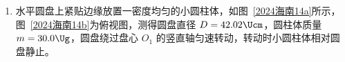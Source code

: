 \documentclass[\gkver]{gaokaozhenti}
\begin{document}
\begin{enumerate}
{联立有

$a_{2} = \frac{F - m_{2}g\sin30^\circ}{m_{2} + CB^{2}L^{2}}$

则说明金属棒 cd 做匀加速直线运动，则有

$x_{0} = \frac{1}{2}a_{2}t^{2}$

联立解得 $a_{2} = 6 \Umsq$，$t = 1.2 \Us$

故 A 错误；

B．由题知，碰前瞬间 ab 的速度为 $4.5 \Ums$，则根据功能关系有

$m_{1}gx_{ab}\sin30^\circ - Q = \frac{1}{2}m_{1}v_{1}^{2}$

金属棒下滑过程中根据动量定理有

$m_{1}g\sin30^\circ\cdot t - B\bar{I}L\cdot t = m_{1}v_{1}$

其中 $q = \bar{I}t = \frac{BLx_{ab}}{R_{\text{总}}}$，$R_{\text{总}} = R + R_{ab} = 0.1 \UO$

联立解得 $q = 6 \UC$，$x_{ab} = 3 \Um$，$Q = 3.9 \UJ$

则 R 上消耗的焦耳热为

$Q_{R} = \frac{R}{R_{\text{总}}}Q = 0.78 \UJ$

故 B 正确；

CD．由于两棒恰好在 M、N 处发生弹性碰撞，取沿斜面向下为正，有

$m_{1}v_{1} - m_{2}v_{2} = m_{1}v_{1}' + m_{2}v_{2}'$

$\frac{1}{2}m_{1}v_{1}^{2} + \frac{1}{2}m_{2}v_{2}^{2} = \frac{1}{2}m_{1}v_{1}'^{2} + \frac{1}{2}m_{2}v_{2}'^{2}$

其中 $v_{2} = a_{2}t = 7.2 \Ums$

联立解得 $v_{1}' = -3.3 \Ums$，$v_{2}' = 8.4 \Ums$

故 C 错误、D 正确。

故选 BD。
}

\item
水平圆盘上紧贴边缘放置一密度均匀的小圆柱体，如图~\ref{2024海南14a}所示，图~\ref{2024海南14b}为俯视图，测得圆盘直径 $D = 42.02 \Ucm$，圆柱体质量 $m = 30.0 \Ug$，圆盘绕过盘心 $O_{1}$ 的竖直轴匀速转动，转动时小圆柱体相对圆盘静止。


\end{enumerate}
\end{document}
